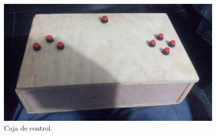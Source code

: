    \begin{figure}[!htbp]
 \centering
 \includegraphics [scale=0.1]
 {./img/20160429_222144.jpg}
 \caption{Caja de control.}
 \end{figure}

 \pagebreak